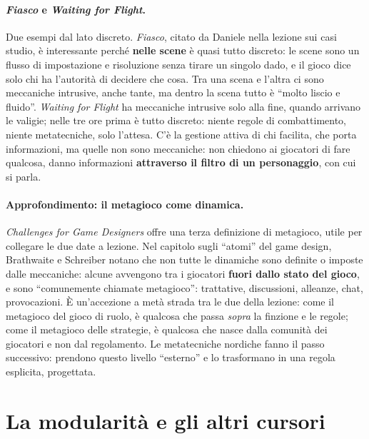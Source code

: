 \paragraph{\emph{Fiasco} e \emph{Waiting for Flight}.} Due esempi dal lato
discreto. \emph{Fiasco}, citato da Daniele nella lezione sui casi studio, è
interessante perché \textbf{nelle scene} è quasi tutto discreto: le scene sono
un flusso di impostazione e risoluzione senza tirare un singolo dado, e il gioco
dice solo chi ha l'autorità di decidere che cosa. Tra una scena e l'altra ci sono
meccaniche intrusive, anche tante, ma dentro la scena tutto è ``molto liscio e
fluido''. \emph{Waiting for Flight} ha meccaniche intrusive solo alla fine,
quando arrivano le valigie; nelle tre ore prima è tutto discreto: niente regole
di combattimento, niente metatecniche, solo l'attesa. C'è la gestione attiva di
chi facilita, che porta informazioni, ma quelle non sono meccaniche: non chiedono
ai giocatori di fare qualcosa, danno informazioni \textbf{attraverso il filtro di
un personaggio}, con cui si parla.

\paragraph{Approfondimento: il metagioco come dinamica.} \emph{Challenges for Game
Designers} offre una terza definizione di metagioco, utile per collegare le due
date a lezione. Nel capitolo sugli ``atomi'' del game design, Brathwaite e
Schreiber notano che non tutte le dinamiche sono definite o imposte dalle
meccaniche: alcune avvengono tra i giocatori \textbf{fuori dallo stato del
gioco}, e sono ``comunemente chiamate metagioco'': trattative, discussioni,
alleanze, chat, provocazioni. È un'accezione a metà strada tra le due della
lezione: come il metagioco del gioco di ruolo, è qualcosa che passa
\emph{sopra} la finzione e le regole; come il metagioco delle strategie, è
qualcosa che nasce dalla comunità dei giocatori e non dal regolamento. Le
metatecniche nordiche fanno il passo successivo: prendono questo livello
``esterno'' e lo trasformano in una regola esplicita, progettata.

\section{La modularità e gli altri cursori}
\label{a3:sec:moduli}



